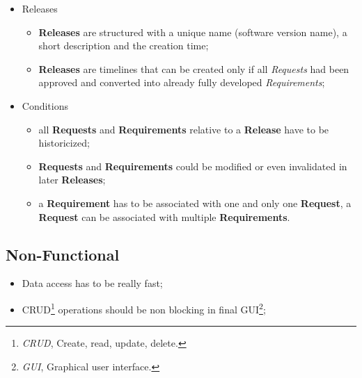 \documentclass[12pt, a4paper]{report}
\begin{document}
\begin{itemize}
    \item Releases
    \begin{itemize}
        \item \textbf{Releases} are structured with a unique name (software version name), a short description and the creation time;
        \item \textbf{Releases} are timelines that can be created only if all \emph{Requests} had been approved and converted into
            already fully developed \emph{Requirements};
    \end{itemize}
    \item Conditions
    \begin{itemize}
        \item all \textbf{Requests} and \textbf{Requirements} relative to a \textbf{Release} have to be historicized;
        \item \textbf{Requests} and \textbf{Requirements} could be modified or even invalidated in later \textbf{Releases};
        \item a \textbf{Requirement} has to be associated with one and only one \textbf{Request}, a \textbf{Request} can be associated
            with multiple \textbf{Requirements}.
    \end{itemize}
\end{itemize}

\subsection*{Non-Functional}

\begin{itemize}
    \item Data access has to be really fast;
    \item CRUD\footnote{\emph{CRUD}, Create, read, update, delete.} operations should be non blocking in final
        GUI\footnote{\emph{GUI}, Graphical user interface.};
\end{itemize}
\end{document}

